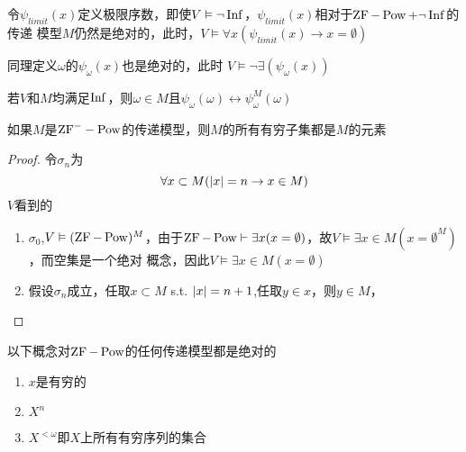 \documentclass[11pt]{article}
\begin{document}
\begin{remark}
令\(\psi_{limit}(x)\)定义极限序数，即使\(V\vDash\neg\operatorname{Inf}\)，\(\psi_{limit}(x)\)相对于\(\operatorname{ZF}-\operatorname{Pow}+\neg\operatorname{Inf}\)的传递
模型\(M\)仍然是绝对的，此时，\(V\vDash\forall x(\psi_{limit}(x)\to x=\emptyset)\)

同理定义\(\omega\)的\(\psi_\omega(x)\)也是绝对的，此时
\(V\vDash\neg\exists(\psi_\omega(x))\)

若\(V\)和\(M\)均满足\(\operatorname{Inf}\)，则\(\omega\in M\)且\(\psi_\omega(\omega)\leftrightarrow\psi_\omega^M(\omega)\)
\end{remark}

\begin{lemma}[]
如果\(M\)是\(\text{ZF}^--\operatorname{Pow}\)的传递模型，则\(M\)的所有有穷子集都是\(M\)的元素
\end{lemma}

\begin{proof}
令\(\sigma_n\)为
\begin{equation*}
\forall x\subset M(\abs{x}=n\to x\in M)
\end{equation*}
\(V\)看到的
\begin{enumerate}
\item \(\sigma_0\),\(V\vDash(\operatorname{ZF}-\operatorname{Pow})^{M}\)，由于\(\operatorname{ZF}-\operatorname{Pow}\vdash\exists x(x=\emptyset)\)，故\(V\vDash\exists x\in M(x=\emptyset^M)\)，而空集是一个绝对
概念，因此\(V\vDash\exists x\in M(x=\emptyset)\)
\item 假设\(\sigma_n\)成立，任取\(x\subset M\) s.t. \(\abs{x}=n+1\),任取\(y\in x\)，则\(y\in M\)，
\end{enumerate}
\end{proof}

\begin{theorem}[]
以下概念对\(\operatorname{ZF}-\operatorname{Pow}\)的任何传递模型都是绝对的
\begin{enumerate}
\item \(x\)是有穷的
\item \(X^n\)
\item \(X^{<\omega}\)即\(X\)上所有有穷序列的集合
\end{enumerate}
\end{theorem}
\end{document}
